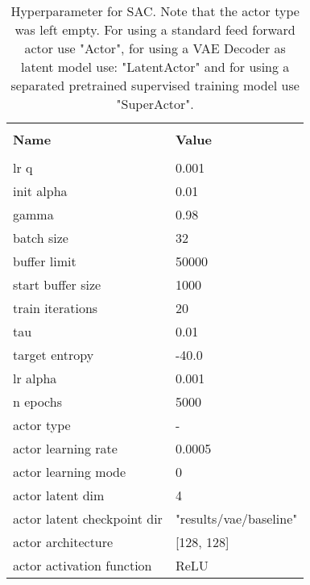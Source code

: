 \begin{table}
    \label{tab:SAC_Baseline_Hyperparameters}
    \begin{center}
        \begin{tabular}{ l | l }
        \hline \\
        \textbf{Name} & \textbf{Value} \\
        \hline \\
        lr q & 0.001 \\
        init alpha & 0.01 \\
        gamma & 0.98\\
        batch size & 32 \\
        buffer limit & 50000 \\
        start buffer size & 1000 \\
        train iterations & 20 \\
        tau & 0.01 \\
        target entropy & -40.0 \\
        lr alpha & 0.001 \\
        n epochs & 5000 \\
        actor type & - \\
        actor learning rate & 0.0005 \\
        actor learning mode & 0 \\
        actor latent dim & 4 \\
        actor latent checkpoint dir & "results/vae/baseline" \\
        actor architecture & [128, 128] \\
        actor activation function & ReLU \\
        \end{tabular}
    \end{center}
    \caption[SAC Hyperparameter]{Hyperparameter for SAC. Note that the actor type was left empty. For using a standard feed forward actor use "Actor", for using a VAE Decoder as  latent model use: "LatentActor" and for using a separated pretrained supervised training model use "SuperActor".}
\end{table}